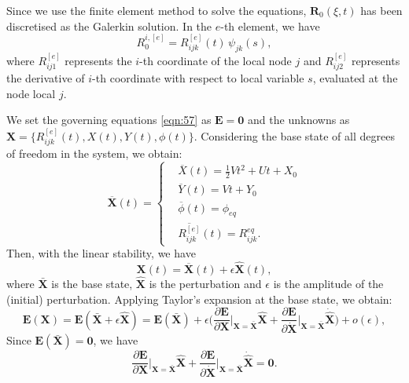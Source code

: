 \documentclass[lineno]{JFM-FLM_Au}
\begin{document}
Since we use the finite element method to solve the equations, $\mathbf{R}_0(\xi,t)$ has been discretised as the Galerkin solution. In the $e$-th element, we have
\begin{equation}
	\label{eqn:108}
	R_0^{i,[e]}=R_{ijk}^{[e]}(t)\, \psi_{jk}(s),
\end{equation}
where $R_{ij1}^{[e]}$ represents the $i$-th coordinate of the local node $j$ and $R_{ij2}^{[e]}$ represents the derivative of $i$-th coordinate with respect to local variable $s$, evaluated at the node local $j$.

We set the governing equations \eqref{eqn:57} as $\mathbf{E}=\mathbf{0}$ and the unknowns as $\mathbf{X}=\{R_{ijk}^{[e]}(t),X(t), Y(t),\phi(t)\}$. Considering the base state of all degrees of freedom in the system, we obtain:
\begin{equation}
	\label{eqn:112}
	\overline{\mathbf{X}}(t)=\left\{\begin{aligned}
		&\overline{X}(t)=\frac{1}{2}Vt^2+Ut+X_{0} \\
		&\overline{Y}(t)=Vt+Y_{0} \\
		&\overline{\phi}(t)=\phi_{eq} \\
		&\overline{R_{ijk}^{[e]}}(t)=R_{ijk}^{eq}.
	\end{aligned}\right.	
\end{equation}
Then, with the linear stability, we have 
\begin{equation}
	\label{eqn:123}
	\mathbf{X}(t)=\overline{\mathbf{X}}(t)+\epsilon \hat{\mathbf{X}}(t),
\end{equation}
where $\bar{\mathbf{X}}$ is the base state, $\hat{\mathbf{X}}$ is the perturbation and $\epsilon$ is the amplitude of the (initial) perturbation.
Applying Taylor's expansion at the base state, we obtain:
\begin{equation}
	\label{eqn:109}
	\mathbf{E}(\mathbf{X})=\mathbf{E}(\bar{\mathbf{X}}+\epsilon \hat{\mathbf{X}})=\mathbf{E}(\bar{\mathbf{X}})+\epsilon \Big(\frac{\partial \mathbf{E}}{\partial \mathbf{X}}\Big|_{\mathbf{X}=\bar{\mathbf{X}}}\hat{\mathbf{X}}+\frac{\partial \mathbf{E}}{\partial \dot{\mathbf{X}}}\Big|_{\mathbf{X}=\bar{\mathbf{X}}}\dot{\hat{\mathbf{X}}}\Big)+o(\epsilon),
\end{equation}
Since $\mathbf{E}(\bar{\mathbf{X}})=\mathbf{0}$, we have 
\begin{equation}
	\label{eqn:110}
	\frac{\partial \mathbf{E}}{\partial \mathbf{X}}\Big|_{\mathbf{X}=\bar{\mathbf{X}}}\hat{\mathbf{X}}+\frac{\partial \mathbf{E}}{\partial \dot{\mathbf{X}}}\Big|_{\mathbf{X}=\bar{\mathbf{X}}}\dot{\hat{\mathbf{X}}}=\mathbf{0}.
\end{equation}
\end{document}

